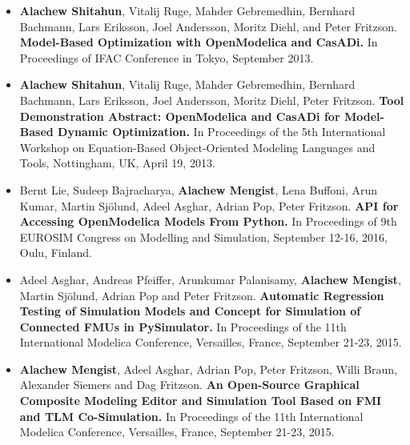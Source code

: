 \begin{itemize}
	
\item[\begin{NoHyper} \cite{alachewoptimization} \end{NoHyper} ] \textbf{Alachew Shitahun}, Vitalij Ruge, Mahder Gebremedhin, Bernhard Bachmann, Lars Eriksson, Joel Andersson, Moritz Diehl, and Peter Fritzson. \textbf{Model-Based Optimization with OpenModelica and CasADi.} In Proceedings of IFAC Conference in Tokyo, September 2013. 

\item[\begin{NoHyper} \cite{alachewoptimizationdemo} \end{NoHyper}]  \textbf{Alachew Shitahun}, Vitalij Ruge, Mahder Gebremedhin, Bernhard Bachmann, Lars Eriksson, Joel Andersson, Moritz Diehl, Peter Fritzson. \textbf{Tool Demonstration Abstract: OpenModelica and CasADi for Model-Based Dynamic Optimization.} In Proceedings of the 5th International Workshop on Equation-Based Object-Oriented Modeling Languages and Tools, Nottingham, UK, April 19, 2013. 

\item[ \begin{NoHyper}  \cite{alachewompython} \end{NoHyper}] Bernt Lie, Sudeep Bajracharya, \textbf{Alachew Mengist}, Lena Buffoni, Arun Kumar, Martin Sj\"{o}lund, Adeel Asghar, Adrian Pop, Peter Fritzson.\textbf{ API for Accessing OpenModelica Models From Python.} In Proceedings of 9th EUROSIM Congress on Modelling and Simulation, September 12-16, 2016, Oulu, Finland. 

\item[\begin{NoHyper} \cite{alachewpysimulator} \end{NoHyper}]  Adeel Asghar, Andreas Pfeiffer, Arunkumar Palanisamy, \textbf{Alachew Mengist}, Martin Sj\"{o}lund, Adrian Pop and Peter Fritzson.\textbf{ Automatic Regression Testing of Simulation Models and Concept for Simulation of Connected FMUs in PySimulator.} In Proceedings of the 11th International Modelica Conference, Versailles, France, September 21-23, 2015. 

\item[\begin{NoHyper} \cite{alachewtlm} \end{NoHyper}]  \textbf{Alachew Mengist}, Adeel Asghar, Adrian Pop, Peter Fritzson, Willi Braun, Alexander Siemers and Dag Fritzson.\textbf{ An Open-Source Graphical Composite Modeling Editor and Simulation Tool Based on FMI and TLM Co-Simulation.} In Proceedings of the 11th International Modelica Conference, Versailles, France, September 21-23, 2015. 



\end{itemize}
